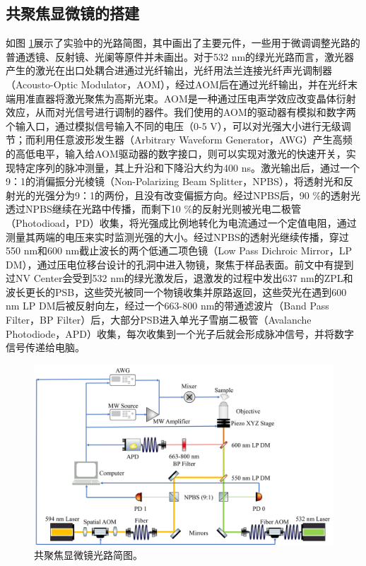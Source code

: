 \documentclass[type = bachelor, oneside]{whu-thesis}
\begin{document}
\subsection{共聚焦显微镜的搭建}
如图 \ref{fig: Light Path}展示了实验中的光路简图，其中画出了主要元件，一些用于微调调整光路的普通透镜、反射镜、光阑等原件并未画出。对于532 nm的绿光光路而言，激光器产生的激光在出口处耦合进通过光纤输出，光纤用法兰连接光纤声光调制器（Acousto-Optic Modulator，AOM），经过AOM后在通过光纤输出，并在光纤末端用准直器将激光聚焦为高斯光束。AOM是一种通过压电声学效应改变晶体衍射效应，从而对光信号进行调制的器件。我们使用的AOM的驱动器有模拟和数字两个输入口，通过模拟信号输入不同的电压（0-5 V），可以对光强大小进行无级调节；而利用任意波形发生器（Arbitrary Waveform Generator，AWG）产生高频的高低电平，输入给AOM驱动器的数字接口，则可以实现对激光的快速开关，实现特定序列的脉冲测量，其上升沿和下降沿大约为400 ns。激光输出后，通过一个9：1的消偏振分光棱镜（Non-Polarizing Beam Splitter，NPBS），将透射光和反射光的光强分为9：1的两份，且没有改变偏振方向。经过NPBS后，90 \%的透射光透过NPBS继续在光路中传播，而剩下10 \%的反射光则被光电二极管（Photodioad，PD）收集，将光强成比例地转化为电流通过一个定值电阻，通过测量其两端的电压来实时监测光强的大小。经过NPBS的透射光继续传播，穿过550 nm和600 nm截止波长的两个低通二项色镜（Low Pass Dichroic Mirror，LP DM），通过压电位移台设计的孔洞中进入物镜，聚焦于样品表面。前文中有提到过NV Center会受到532 nm的绿光激发后，退激发的过程中发出637 nm的ZPL和波长更长的PSB，这些荧光被同一个物镜收集并原路返回，这些荧光在遇到600 nm LP DM后被反射向左，经过一个663-800 nm的带通滤波片（Band Pass Filter，BP Filter）后，大部分PSB进入单光子雪崩二极管（Avalanche Photodiode，APD）收集，每次收集到一个光子后就会形成脉冲信号，并将数字信号传递给电脑。
\begin{figure}
  \centering
  \includegraphics[width=1.0\textwidth]{figures/Chapter 2/Light Path.png}
  \caption[共聚焦显微镜光路简图]{共聚焦显微镜光路简图。}
  \label{fig: Light Path}
\end{figure}
\end{document}

